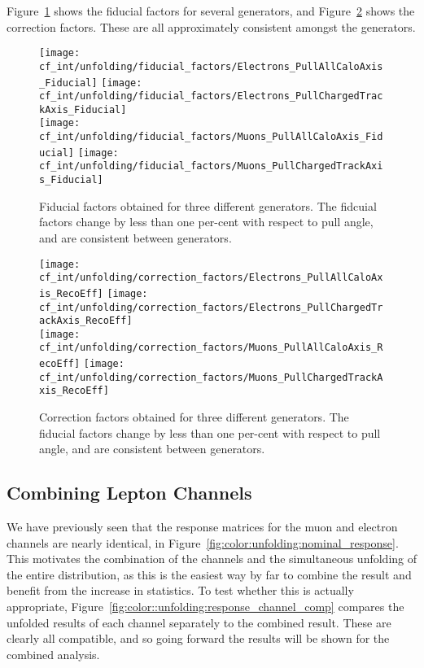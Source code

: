 	Figure~\ref{fig:color:unfolding:fiducial_factors} shows the fiducial factors for several generators, and Figure~\ref{fig:color:unfolding:correction_factors} shows the correction factors. These are all approximately consistent amongst the generators.
%
\begin{figure}
  \texttt{[image: cf\_int/unfolding/fiducial\_factors/Electrons\_PullAllCaloAxis\_Fiducial]}
  \texttt{[image: cf\_int/unfolding/fiducial\_factors/Electrons\_PullChargedTrackAxis\_Fiducial]} \\
    \texttt{[image: cf\_int/unfolding/fiducial\_factors/Muons\_PullAllCaloAxis\_Fiducial]}
    \texttt{[image: cf\_int/unfolding/fiducial\_factors/Muons\_PullChargedTrackAxis\_Fiducial]}
    \caption{Fiducial factors obtained for three different generators.
      The fidcuial factors change by less than one per-cent with respect
      to pull angle, and are consistent between generators.}
      \label{fig:color:unfolding:fiducial_factors}
\end{figure}
%
\begin{figure}
  \texttt{[image: cf\_int/unfolding/correction\_factors/Electrons\_PullAllCaloAxis\_RecoEff]}
  \texttt{[image: cf\_int/unfolding/correction\_factors/Electrons\_PullChargedTrackAxis\_RecoEff]} \\
    \texttt{[image: cf\_int/unfolding/correction\_factors/Muons\_PullAllCaloAxis\_RecoEff]}
    \texttt{[image: cf\_int/unfolding/correction\_factors/Muons\_PullChargedTrackAxis\_RecoEff]}
    \caption{Correction factors obtained for three different generators.
      The fiducial factors change by less than one per-cent with respect
      to pull angle, and are consistent between generators.}
      \label{fig:color:unfolding:correction_factors}
\end{figure}



	\subsection{Combining Lepton Channels}
	We have previously seen that the response matrices for the muon and electron channels are nearly identical, in Figure~\ref{fig:color:unfolding:nominal_response}. This motivates the combination of the channels and the simultaneous unfolding of the entire distribution, as this is the easiest way by far to combine the result and benefit from the increase in statistics. To test whether this is actually appropriate, Figure~\ref{fig:color::unfolding:response_channel_comp} compares the unfolded results of each channel separately to the combined result. These are clearly all compatible, and so going forward the results will be shown for the combined analysis.

